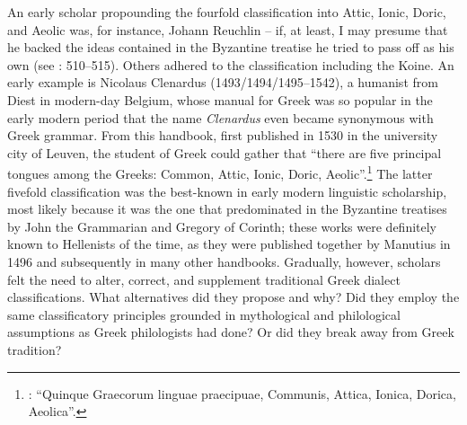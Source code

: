 An early scholar propounding the fourfold classification into Attic, Ionic, Dor\-ic, and Aeolic was, for instance, Johann Reuchlin – if, at least, I may presume that he backed the ideas contained in the Byzantine treatise he tried to pass off as his own (see \citealt{VanRooy2014}: 510–515). Others adhered to the classification including the Koine. An early example is Nicolaus Clenardus (1493/1494/1495–1542), a humanist from Diest in modern-day Belgium, whose manual for Greek was so popular in the early modern period that the name \textit{Clenardus} even became synonymous with Greek grammar. From this handbook, first published in 1530 in the university city of Leuven, the student of Greek could gather that “there are five principal tongues among the Greeks: Common, Attic, Ionic, Doric, Aeolic”.\footnote{\citet[7 (misprint for 6)]{Clenardus1530}: “Quinque Graecorum linguae praecipuae, Communis, Attica, Ionica, Dorica, Aeolica”.} The latter fivefold classification was the best-known in early modern linguistic scholarship, most likely because it was the one that predominated in the Byzantine treatises by John the Grammarian and Gregory of Corinth; these works were definitely known to Hellenists of the time, as they were published together by Manutius in 1496 and subsequently in many other handbooks. Gradually, however, scholars felt the need to alter, correct, and supplement traditional Greek dialect classifications. What alternatives did they propose and why? Did they employ the same classificatory principles grounded in mythological and philological assumptions as Greek philologists had done? Or did they break away from Greek tradition?

